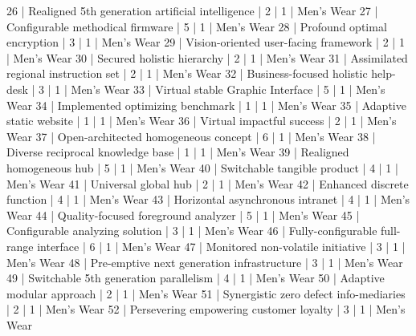 \begin{enumerate}
\begin{pseudo*}
      26 | Realigned 5th generation artificial intelligence |        2 |      1 | Men's Wear    
      27 | Configurable methodical firmware                 |        5 |      1 | Men's Wear    
      28 | Profound optimal encryption                      |        3 |      1 | Men's Wear    
      29 | Vision-oriented user-facing framework            |        2 |      1 | Men's Wear    
      30 | Secured holistic hierarchy                       |        2 |      1 | Men's Wear    
      31 | Assimilated regional instruction set             |        2 |      1 | Men's Wear    
      32 | Business-focused holistic help-desk              |        3 |      1 | Men's Wear    
      33 | Virtual stable Graphic Interface                 |        5 |      1 | Men's Wear    
      34 | Implemented optimizing benchmark                 |        1 |      1 | Men's Wear    
      35 | Adaptive static website                          |        1 |      1 | Men's Wear    
      36 | Virtual impactful success                        |        2 |      1 | Men's Wear    
      37 | Open-architected homogeneous concept             |        6 |      1 | Men's Wear    
      38 | Diverse reciprocal knowledge base                |        1 |      1 | Men's Wear    
      39 | Realigned homogeneous hub                        |        5 |      1 | Men's Wear    
      40 | Switchable tangible product                      |        4 |      1 | Men's Wear    
      41 | Universal global hub                             |        2 |      1 | Men's Wear    
      42 | Enhanced discrete function                       |        4 |      1 | Men's Wear    
      43 | Horizontal asynchronous intranet                 |        4 |      1 | Men's Wear    
      44 | Quality-focused foreground analyzer              |        5 |      1 | Men's Wear    
      45 | Configurable analyzing solution                  |        3 |      1 | Men's Wear    
      46 | Fully-configurable full-range interface          |        6 |      1 | Men's Wear    
      47 | Monitored non-volatile initiative                |        3 |      1 | Men's Wear    
      48 | Pre-emptive next generation infrastructure       |        3 |      1 | Men's Wear    
      49 | Switchable 5th generation parallelism            |        4 |      1 | Men's Wear    
      50 | Adaptive modular approach                        |        2 |      1 | Men's Wear    
      51 | Synergistic zero defect info-mediaries           |        2 |      1 | Men's Wear    
      52 | Persevering empowering customer loyalty          |        3 |      1 | Men's Wear    

\end{pseudo*}
\end{enumerate}
